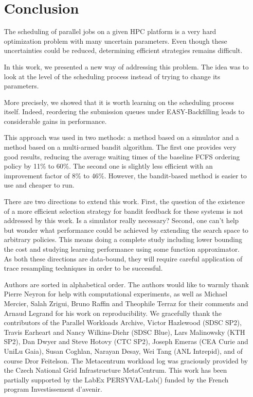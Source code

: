 \documentclass[sigconf,anonymous]{acmart}
\begin{document}
\section{Conclusion}
\label{sec:ccl}

The scheduling of parallel jobs on a given HPC platform is a very hard
optimization problem with many uncertain parameters. Even though these
uncertainties could be reduced, determining efficient strategies remains
difficult.

In this work, we presented a new way of addressing this problem. The idea was
to look at the level of the scheduling process instead of trying to change its
parameters.

More precisely, we showed that it is worth learning on the scheduling process
itself. Indeed, reordering the submission queues under EASY-Backfilling leads
to considerable gains in performance.

This approach was used in two methods: a method based on a simulator and a
method based on a multi-armed bandit algorithm. The first one provides very
good results, reducing the average waiting times of the baseline FCFS ordering
policy by 11\% to 60\%. The second one is slightly less efficient with an
improvement factor of 8\% to 46\%. However, the bandit-based method is easier
to use and cheaper to run.

There are two directions to extend this work.  First, the question of
the existence of a more efficient selection strategy for bandit feedback for
these systems is not addressed by this work. Is a simulator really necessary?
Second, one can't help but wonder what performance could be achieved by extending
the search space to arbitrary policies. This means doing a complete study
including lower bounding the cost and studying learning performance using some
function approximator.
As both these directions are data-bound, they will require careful application of
trace resampling techniques in order to be successful.

\begin{acks}

Authors are sorted in alphabetical order. The authors would like to warmly
thank Pierre Neyron for help with computational experiments, as well as Michael
Mercier, Salah Zrigui, Bruno Raffin and Theophile Terraz for their comments and
Arnaud Legrand for his work on reproducibility. We gracefully thank the
contributors of the Parallel Workloads Archive, Victor Hazlewood (SDSC SP2),
Travis Earheart and Nancy Wilkins-Diehr (SDSC Blue), Lars Malinowsky (KTH SP2),
Dan Dwyer and Steve Hotovy (CTC SP2), Joseph Emeras (CEA Curie and UniLu Gaia),
Susan Coghlan, Narayan Desay, Wei Tang (ANL Intrepid), and of course Dror
Feitelson.  The Metacentrum workload log was graciously provided by the Czech
National Grid Infrastructure MetaCentrum. This work has been partially
supported by the LabEx
PERSYVAL-Lab() funded by
the French program Investissement d'avenir. 

\end{acks}
\end{document}
